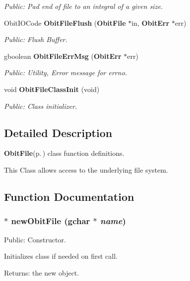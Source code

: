 \begin{CompactItemize}
\begin{CompactList}\small\item\em Public: Pad end of file to an integral of a given size. \item\end{CompactList}\item 
Obit\-IOCode {\bf Obit\-File\-Flush} ({\bf Obit\-File} $\ast$in, {\bf Obit\-Err} $\ast$err)
\begin{CompactList}\small\item\em Public: Flush Buffer. \item\end{CompactList}\item 
gboolean {\bf Obit\-File\-Err\-Msg} ({\bf Obit\-Err} $\ast$err)
\begin{CompactList}\small\item\em Public: Utility, Error message for errno. \item\end{CompactList}\item 
void {\bf Obit\-File\-Class\-Init} (void)
\begin{CompactList}\small\item\em Public: Class initializer. \item\end{CompactList}\end{CompactItemize}


\subsection{Detailed Description}
{\bf Obit\-File}{\rm (p.\,\pageref{structObitFile})} class function definitions. 

This Class allows access to the underlying file system.

\subsection{Function Documentation}
\subsubsection{$\ast$ new\-Obit\-File (gchar $\ast$ {\em name})}\label{ObitFile_8c_a6}


Public: Constructor. 

Initializes class if needed on first call. \begin{Desc}
\item[Returns:]the new object. \end{Desc}
